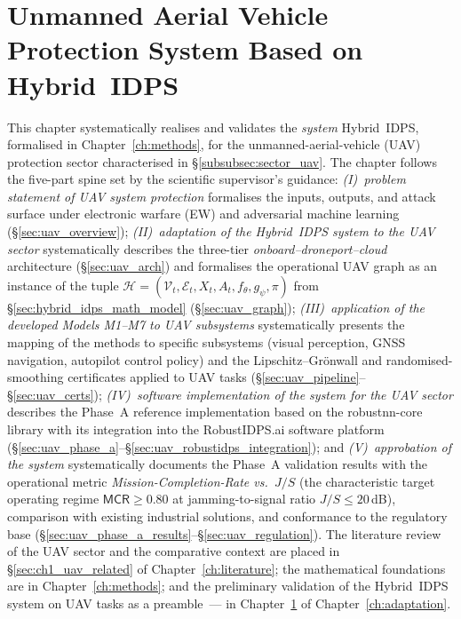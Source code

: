 
\chapter{Unmanned Aerial Vehicle Protection System Based on Hybrid~IDPS}
\label{ch:uav}

This chapter systematically realises and validates the
\emph{system} Hybrid~IDPS, formalised in Chapter~\ref{ch:methods},
for the unmanned-aerial-vehicle (UAV) protection sector
characterised in \S\ref{subsubsec:sector_uav}. The chapter follows
the five-part spine set by the scientific supervisor's guidance:
\emph{(I)~problem statement of UAV system protection} formalises
the inputs, outputs, and attack surface under electronic warfare
(EW) and adversarial machine learning
(\S\ref{sec:uav_overview});
\emph{(II)~adaptation of the Hybrid~IDPS system to the UAV
sector} systematically describes the three-tier
\emph{onboard--droneport--cloud} architecture
(\S\ref{sec:uav_arch}) and formalises the operational UAV graph
as an instance of the tuple
$\mathcal{H}=(\mathcal{V}_t, \mathcal{E}_t, X_t, A_t, f_\theta,
g_\psi, \pi)$ from \S\ref{sec:hybrid_idps_math_model}
(\S\ref{sec:uav_graph});
\emph{(III)~application of the developed Models M1--M7 to UAV
subsystems} systematically presents the mapping of the methods
to specific subsystems (visual perception, GNSS navigation,
autopilot control policy) and the Lipschitz--Grönwall and
randomised-smoothing certificates applied to UAV tasks
(\S\ref{sec:uav_pipeline}--\S\ref{sec:uav_certs});
\emph{(IV)~software implementation of the system for the UAV
sector} describes the Phase~A reference implementation based on
the \textsf{robustnn-core} library with its integration into the
\textsf{RobustIDPS.ai} software platform
(\S\ref{sec:uav_phase_a}--\S\ref{sec:uav_robustidps_integration});
and \emph{(V)~approbation of the system} systematically documents
the Phase~A validation results with the operational metric
\emph{Mission-Completion-Rate vs.~$J/S$} (the characteristic
target operating regime $\textsf{MCR}\ge 0.80$ at jamming-to-signal
ratio $J/S \le 20\,$dB), comparison with existing industrial
solutions, and conformance to the regulatory base
(\S\ref{sec:uav_phase_a_results}--\S\ref{sec:uav_regulation}). The
literature review of the UAV sector and the comparative context
are placed in \S\ref{sec:ch1_uav_related} of
Chapter~\ref{ch:literature}; the mathematical foundations are in
Chapter~\ref{ch:methods}; and the preliminary validation of the
Hybrid~IDPS system on UAV tasks as a preamble~--- in
Chapter~\ref{ch:uav} of Chapter~\ref{ch:adaptation}.

